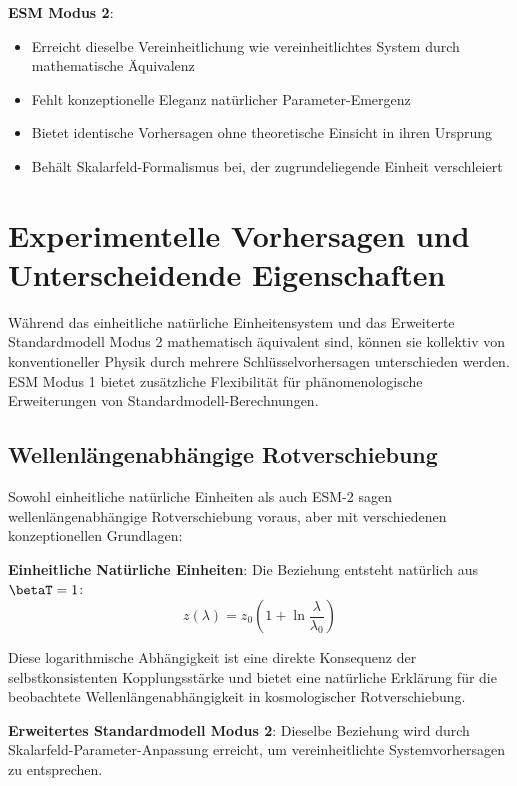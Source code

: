 	\textbf{ESM Modus 2}:
	\begin{itemize}
		\item Erreicht dieselbe Vereinheitlichung wie vereinheitlichtes System durch mathematische Äquivalenz
		\item Fehlt konzeptionelle Eleganz natürlicher Parameter-Emergenz
		\item Bietet identische Vorhersagen ohne theoretische Einsicht in ihren Ursprung
		\item Behält Skalarfeld-Formalismus bei, der zugrundeliegende Einheit verschleiert
	\end{itemize}
	
	\section{Experimentelle Vorhersagen und Unterscheidende Eigenschaften}
	\label{sec:experimental_predictions}
	
	Während das einheitliche natürliche Einheitensystem und das Erweiterte Standardmodell Modus 2 mathematisch äquivalent sind, können sie kollektiv von konventioneller Physik durch mehrere Schlüsselvorhersagen unterschieden werden. ESM Modus 1 bietet zusätzliche Flexibilität für phänomenologische Erweiterungen von Standardmodell-Berechnungen.
	
	\subsection{Wellenlängenabhängige Rotverschiebung}
	\label{subsec:wavelength_dependent_redshift}
	
	Sowohl einheitliche natürliche Einheiten als auch ESM-2 sagen wellenlängenabhängige Rotverschiebung voraus, aber mit verschiedenen konzeptionellen Grundlagen:
	
	\textbf{Einheitliche Natürliche Einheiten}: Die Beziehung entsteht natürlich aus $\betaT = 1$:
	\begin{equation}
		z(\lambda) = z_0\left(1 + \ln\frac{\lambda}{\lambda_0}\right)
	\end{equation}
	
	Diese logarithmische Abhängigkeit ist eine direkte Konsequenz der selbstkonsistenten Kopplungsstärke und bietet eine natürliche Erklärung für die beobachtete Wellenlängenabhängigkeit in kosmologischer Rotverschiebung.
	
	\textbf{Erweitertes Standardmodell Modus 2}: Dieselbe Beziehung wird durch Skalarfeld-Parameter-Anpassung erreicht, um vereinheitlichte Systemvorhersagen zu entsprechen.
	
